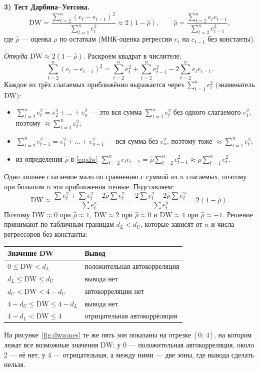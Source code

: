 \textbf{3) Тест Дарбина--Уотсона.}
\begin{equation}
  \mathrm{DW} = \frac{\sum_{t=2}^{n}(e_t - e_{t-1})^2}{\sum_{t=1}^{n}e_t^2}
  \approx 2(1 - \widehat{\rho}),
  \qquad
  \widehat{\rho} = \frac{\sum_{t=2}^{n}e_te_{t-1}}{\sum_{t=2}^{n}e_{t-1}^2},
  \label{eq:dw}
\end{equation}
где $\widehat\rho$ — оценка $\rho$ по остаткам (МНК-оценка регрессии $e_t$ на
$e_{t-1}$ без константы).

\noindent\emph{Откуда $\mathrm{DW} \approx 2(1 - \widehat\rho)$.} Раскроем
квадрат в числителе:
\[
  \sum_{t=2}^{n}(e_t - e_{t-1})^2
  = \sum_{t=2}^{n}e_t^2 + \sum_{t=2}^{n}e_{t-1}^2 - 2\sum_{t=2}^{n}e_te_{t-1} .
\]
Каждое из трёх слагаемых приближённо выражается через $\sum_{t=1}^{n}e_t^2$
(знаменатель DW):
\begin{itemize}[leftmargin=2.2em, itemsep=1pt]
  \item $\sum_{t=2}^{n}e_t^2 = e_2^2 + \dots + e_n^2$ — это вся сумма
        $\sum_{t=1}^{n}e_t^2$ без одного слагаемого $e_1^2$, поэтому
        $\approx \sum_{t=1}^{n}e_t^2$;
  \item $\sum_{t=2}^{n}e_{t-1}^2 = e_1^2 + \dots + e_{n-1}^2$ — вся сумма без
        $e_n^2$, поэтому тоже $\approx \sum_{t=1}^{n}e_t^2$;
  \item из определения $\widehat\rho$ в \eqref{eq:dw}
        $\sum_{t=2}^{n}e_te_{t-1} = \widehat\rho\sum_{t=2}^{n}e_{t-1}^2
        \approx \widehat\rho\sum_{t=1}^{n}e_t^2$.
\end{itemize}
Одно лишнее слагаемое мало по сравнению с суммой из $n$ слагаемых, поэтому
при большом $n$ эти приближения точные. Подставляем:
\[
  \mathrm{DW} \approx \frac{\sum e_t^2 + \sum e_t^2 - 2\widehat\rho\sum e_t^2}{\sum e_t^2}
  = \frac{2\sum e_t^2 - 2\widehat\rho\sum e_t^2}{\sum e_t^2} = 2(1 - \widehat\rho).
\]
Поэтому $\mathrm{DW} \approx 0$ при $\widehat\rho \approx 1$,
$\mathrm{DW} \approx 2$ при $\widehat\rho \approx 0$ и $\mathrm{DW} \approx 4$
при $\widehat\rho \approx -1$. Решение принимают по табличным границам
$d_L < d_U$, которые зависят от $n$ и числа регрессоров без константы:
\begin{center}
\begin{tabular*}{\linewidth}{@{\extracolsep{\fill}}ll@{}}
\toprule
Значение DW & Вывод \\
\midrule
$0 \le \mathrm{DW} < d_L$ & положительная автокорреляция \\
$d_L \le \mathrm{DW} \le d_U$ & вывода нет \\
$d_U < \mathrm{DW} < 4 - d_U$ & автокорреляции нет \\
$4 - d_U \le \mathrm{DW} \le 4 - d_L$ & вывода нет \\
$4 - d_L < \mathrm{DW} \le 4$ & отрицательная автокорреляция \\
\bottomrule
\end{tabular*}
\end{center}
\noindent На рисунке~\ref{fig:dwzones} те же пять зон показаны на отрезке
$[0;\,4]$, на котором лежат все возможные значения DW: у 0 —
положительная автокорреляция, около 2 — её нет, у 4 — отрицательная, а
между ними — две зоны, где вывода сделать нельзя.

